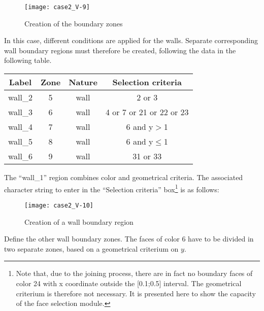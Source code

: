 \begin{figure}[h!]
\begin{center}
\texttt{[image: case2\_V-9]}
\caption{Creation of the boundary zones}
\label{fig10_e2}
\end{center}
\end{figure}


\newpage
In this case, different conditions are applied for the walls. Separate
corresponding wall boundary regions must therefore be created, following the
data in the following table.

\begin{center}
\begin{tabular}{|c|c|c|c|}
\hline
Label & Zone & Nature & Selection criteria \\
\hline
\hline
wall\_2 & 5 & wall & 2 or 3 \\
\hline
wall\_3 & 6 & wall & 4 or 7 or 21 or 22 or 23 \\
\hline
wall\_4 & 7 & wall & 6 and y$>$1 \\
\hline
wall\_5 & 8 & wall & 6 and y$\leqslant$1 \\
\hline
wall\_6 & 9 & wall & 31 or 33 \\
\hline
\end{tabular}
\end{center}

The ``wall\_1'' region combines color and geometrical criteria. The associated
character string to enter in the ``Selection criteria'' box\footnote{Note that, due to the joining process,
there are in fact no boundary faces of color 24 with x coordinate outside the
[0.1;0.5] interval. The geometrical criterium is therefore not necessary.
It is presented here to show the capacity of the face selection module.}
 is as follows:\\

\begin{figure}[h!]
\begin{center}
\texttt{[image: case2\_V-10]}
\caption{Creation of a wall boundary region}
\label{fig11_e2}
\end{center}
\end{figure}


\newpage
Define the other wall boundary zones. The faces of color 6 have to be divided in
two separate zones, based on a geometrical criterium on $y$.

